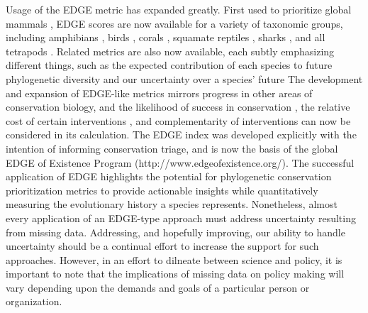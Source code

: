 \documentclass[10pt,english]{article}
\begin{document}
Usage of the EDGE metric has expanded greatly. First used to prioritize global
mammals \autocite{Isaac2007}, EDGE scores are now available for a variety of
taxonomic groups, including amphibians \autocite{Isaac2012}, birds
\autocite{Jetz2014}, corals \autocite{Curnick2015}, squamate reptiles
\autocite{Tonini2016}, sharks \autocite{Stein2018}, and all tetrapods
\autocite{Gumbs2018}. Related metrics are also now available, each subtly
emphasizing different things, such as the expected contribution of each species
to future phylogenetic diversity \autocite[HEDGE,
I-HEDGE;][]{Steel2007,Jensen2016} and our uncertainty over a species' future
\autocite[EDAM;][]{Pearse2015} The development and expansion of EDGE-like
metrics mirrors progress in other areas of conservation biology, and the
likelihood of success in conservation \autocite{Wilson2007, Mcbride2007}, the
relative cost of certain interventions \autocite{Naidoo2006}, and
complementarity of interventions \autocite{Pressey1993, Myers2000} can now be
considered in its calculation. The EDGE index was developed explicitly with the
intention of informing conservation triage, and is now the basis of the global
EDGE of Existence Program (http://www.edgeofexistence.org/). The successful
application of EDGE highlights the potential for phylogenetic conservation
prioritization metrics to provide actionable insights while quantitatively
measuring the evolutionary history a species represents. Nonetheless, almost
every application of an EDGE-type approach must address uncertainty resulting
from missing data. Addressing, and hopefully improving, our ability to
handle uncertainty should be a continual effort to increase the support for such
approaches. However, in an effort to dilneate between science and policy, it is
important to note that the implications of missing data on policy making will
vary depending upon the demands and goals of a particular person or
organization.
\end{document}
